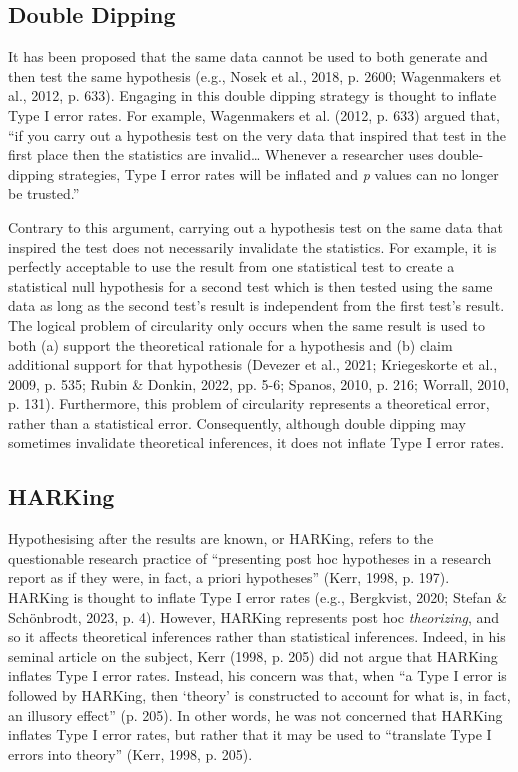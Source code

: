 \documentclass[authordate, empirical]{jote-new-article}
\begin{document}
	\subsection{Double Dipping}



	It has been proposed that the same data cannot be used to both generate and then test the same hypothesis (e.g., Nosek et al., 2018, p. 2600; Wagenmakers et al., 2012, p. 633). Engaging in this double dipping strategy is thought to inflate Type I error rates. For example, Wagenmakers et al. (2012, p. 633) argued that, “if you carry out a hypothesis test on the very data that inspired that test in the first place then the statistics are invalid… Whenever a researcher uses double-dipping strategies, Type I error rates will be inflated and\emph{ p} values can no longer be trusted.”



	Contrary to this argument, carrying out a hypothesis test on the same data that inspired the test does not necessarily invalidate the statistics. For example, it is perfectly acceptable to use the result from one statistical test to create a statistical null hypothesis for a second test which is then tested using the same data as long as the second test's result is independent from the first test's result. The logical problem of circularity only occurs when the same result is used to both (a) support the theoretical rationale for a hypothesis and (b) claim additional support for that hypothesis (Devezer et al., 2021; Kriegeskorte et al., 2009, p. 535; Rubin \& Donkin, 2022, pp. 5-6; Spanos, 2010, p. 216; Worrall, 2010, p. 131). Furthermore, this problem of circularity represents a theoretical error, rather than a statistical error. Consequently, although double dipping may sometimes invalidate theoretical inferences, it does not inflate Type I error rates.



	\subsection{HARKing}



	Hypothesising after the results are known, or HARKing, refers to the questionable research practice of “presenting post hoc hypotheses in a research report as if they were, in fact, a priori hypotheses” (Kerr, 1998, p. 197). HARKing is thought to inflate Type I error rates (e.g., Bergkvist, 2020; Stefan \& Schönbrodt, 2023, p. 4). However, HARKing represents post hoc \emph{theorizing}, and so it affects theoretical inferences rather than statistical inferences. Indeed, in his seminal article on the subject, Kerr (1998, p. 205) did not argue that HARKing inflates Type I error rates. Instead, his concern was that, when “a Type I error is followed by HARKing, then ‘theory' is constructed to account for what is, in fact, an illusory effect” (p. 205). In other words, he was not concerned that HARKing inflates Type I error rates, but rather that it may be used to “translate Type I errors into theory” (Kerr, 1998, p. 205).
\end{document}
